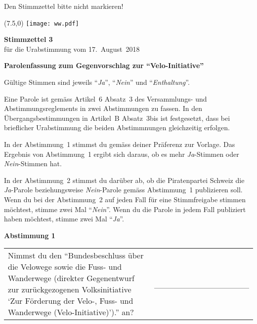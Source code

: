 \documentclass[11pt, a4paper]{scrartcl}
\newcommand{\votingdate}{17.~August~2018}
\newcommand{\ja}{\enquote{\textit{Ja}}}
\newcommand{\nein}{\enquote{\textit{Nein}}}
\newcommand{\enthaltung}{\enquote{\textit{Enthaltung}}}
\begin{document}
{\begin{minipage}[t][12.5cm][t]{17.7cm}
\vspace{0.5cm}

Den Stimmzettel bitte nicht markieren!

\end{minipage}

\newpage

\begin{minipage}[t][12.5cm][t]{17.7cm}

\begin{textblock}{6}(7.5,0)
\texttt{[image: ww.pdf]}
\end{textblock}

{\LARGE\textbf{Stimmzettel 3}} \\
für die Urabstimmung vom \votingdate{} \\

\vspace{2cm}

\textbf{Parolenfassung zum Gegenvorschlag zur \enquote{Velo-Initiative}}

\vspace{0.2cm}
Gültige Stimmen sind jeweils \ja{}, \nein{} und \enthaltung{}.

\vspace{0.2cm}
Eine Parole ist gemäss Artikel~6 Absatz~3 des Versammlungs- und Abstimmungsreglements in zwei Abstimmungen zu fassen. In den Übergangsbestimmungen in Artikel~B Absatz~3bis ist festgesetzt, dass bei brieflicher Urabstimmung die beiden Abstimmnungen gleichzeitig erfolgen.

\vspace{0.2cm}
In der Abstimmung~1 stimmst du gemäss deiner Präferenz zur Vorlage. Das Ergebnis von Abstimmung~1 ergibt sich daraus, ob es mehr \textit{Ja}-Stimmen oder \textit{Nein}-Stimmen hat. 

\vspace{0.2cm}
In der Abstimmung~2 stimmst du darüber ab, ob die Piratenpartei Schweiz die \textit{Ja}-Parole beziehungsweise \textit{Nein}-Parole gemäss Abstimmung~1 publizieren soll. Wenn du bei der Abstimmung~2 auf jeden Fall für eine Stimmfreigabe stimmen möchtest, stimme zwei Mal \nein{}. Wenn du die Parole in jedem Fall publiziert haben möchtest, stimme zwei Mal \ja{}.

\vspace{1cm}

\textbf{Abstimmung 1}

\vspace{0.5cm}

\begin{tabular}{ b{13.5cm} b{3cm} }
Nimmst du den \enquote{Bundesbeschluss über die Velowege sowie die Fuss- und Wanderwege (direkter Gegenentwurf zur zurückgezogenen Volksinitiative \enquote{Zur Förderung der Velo-, Fuss- und Wanderwege (Velo-Initiative)}).} an?
& \_\_\_\_\_\_\_\_\_\_\_\_\_\_\_\_ \\
\end{tabular}


\end{minipage}}
\end{document}
